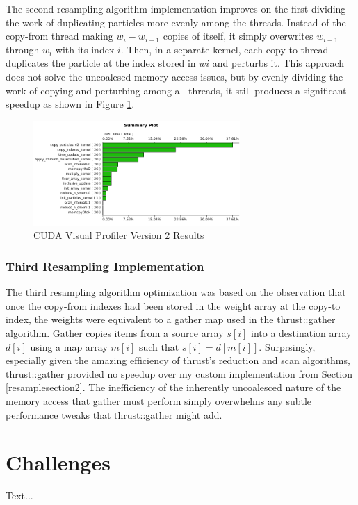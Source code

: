 \documentclass{article}
\begin{document}
The second resampling algorithm implementation improves on the first dividing the work of duplicating particles more evenly among the threads. Instead of the copy-from thread making \(w_{i}-w_{i-1}\) copies of itself, it simply overwrites \(w_{i-1}\) through \(w_{i}\) with its index \(i\). Then, in a separate kernel, each copy-to thread duplicates the particle at the index stored in \(w{i}\) and perturbs it. This approach does not solve the uncoalesed memory access issues, but by evenly dividing the work of copying and perturbing among all threads, it still produces a significant speedup as shown in Figure \ref{profiler2}.

\begin{figure}
\centering
\includegraphics[width=0.7\textwidth]{data/profile_cuda_version2_pic1.png}
\caption{CUDA Visual Profiler Version 2 Results}
\label{profiler2}
\end{figure}

\subsubsection{Third Resampling Implementation}
The third resampling algorithm optimization was based on the observation that once the copy-from indexes had been stored in the weight array at the copy-to index, the weights were equivalent to a gather map used in the thrust::gather algorithm.\cite{thrust} Gather copies items from a source array \(s[i]\) into a destination array \(d[i]\) using a map array \(m[i]\) such that \(s[i]=d[m[i]]\). Surprsingly, especially given the amazing efficiency of thrust's reduction and scan algorithms, thrust::gather provided no speedup over my custom implementation from Section \ref{resamplesection2}. The inefficiency of the inherently uncoalesced nature of the memory access that gather must perform simply overwhelms any subtle performance tweaks that thrust::gather might add.

\section{Challenges}
Text...
\end{document}
